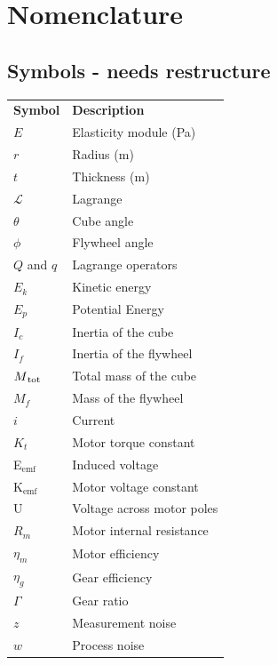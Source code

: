\documentclass[a4paper,11pt]{kth-mag}
\newcommand{\textunderscript}[1]{$_{\text{#1}}$}
\begin{document}


\cleardoublepage
{}
\printindex
\tableofcontents*

\cleardoublepage
\chapter*{Nomenclature}
\section*{Symbols - needs restructure}
\noindent{}\begin{tabular}{@{}p{2.5cm}l}
\textbf{Symbol} 	& \textbf{Description} \vspace{.5em} \\
$E$ 		& Elasticity module (Pa) \\
$r$		& Radius (m) \\
$t$		& Thickness (m) \\
$\mathcal{L}$			& Lagrange \\
$\theta$		& Cube angle\\
$\phi$		& Flywheel angle \\
$Q$ and $q$		& Lagrange operators \\
$E_k	$		& Kinetic energy \\
$E_p$		& Potential Energy \\
$I_c$		& Inertia of the cube\\
$I_f$		& Inertia of the flywheel\\
$M\textsubscript{tot}$		& Total mass of the cube\\
$M_f$		& Mass of the flywheel \\
$i$			& Current\\
$K_t$		& Motor torque constant\\
E\textunderscript{emf} 	& Induced voltage \\
K\textunderscript{emf} 	& Motor voltage constant \\
U			& Voltage across motor poles\\
$R_m	$		& Motor internal resistance \\
$\eta_m$		& Motor efficiency\\	
$\eta_g$		& Gear efficiency \\
$\Gamma$		& Gear ratio\\
$z$			& Measurement noise \\
$w$			& Process noise \\

\end{tabular}
\clearpage
\end{document}
